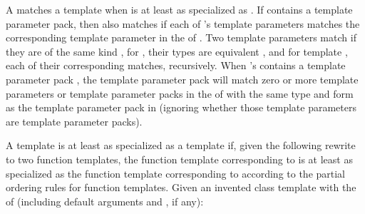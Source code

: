 \documentclass{wg21}
\begin{document}

\pnum
A    matches a template
  when 
 is at least as specialized as  .
If  contains a template parameter pack, then  also matches 
if each of 's template parameters
matches the corresponding template parameter  in the
 of .
Two template parameters match if they are of the same kind ,
for , their types are
equivalent , and for template ,
each of their corresponding  matches, recursively.
When 's  contains
a  template parameter
pack , the template parameter pack will match zero or more template
parameters or template parameter packs  in the  of
 with the same type and form as the template parameter pack  in 
(ignoring whether those template parameters are template parameter packs).

\pnum
A template   is
at least as specialized as a template  
if, given the following rewrite to two function templates,
the function template corresponding to 
is at least as specialized as
the function template corresponding to 
according to the partial ordering rules
for function templates.
Given an invented class template 
with the  of  (including default arguments
and , if any):
\end{document}
